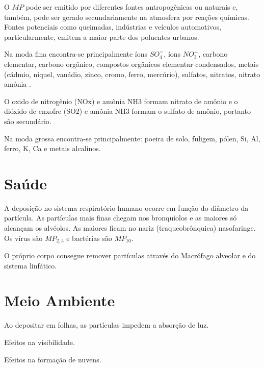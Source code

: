 O $MP$ pode ser emitido por diferentes fontes antropogênicas ou naturais e, 
também, pode ser gerado secundariamente na atmosfera por reações químicas. 
Fontes potenciais como queimadas, indústrias e veículos automotivos, particularmente,
emitem a maior parte dos poluentes urbanos.

Na moda fina encontra-se principalmente íons $SO_4^=$, 
íons $ NO_3^-$, carbono elementar, carbono orgânico, compostos orgânicos elementar
condensados, metais (cádmio, níquel, vanádio, zinco, cromo, ferro, mercúrio), 
sulfatos, nitratos, nitrato amônia \cite{finlayson1999}. 

O oxido de nitrogênio (NOx) e amônia NH3 formam nitrato de amônio e 
o dióxido de enxofre (SO2) e amônia NH3 formam o sulfato de amônio, 
portanto são secundário.

Na moda grossa encontra-se principalmente: poeira de solo, fuligem, 
pólen, Si, Al, ferro, K, Ca e metais alcalinos.

\section{Saúde}

A deposição no sistema respiratório humano ocorre em função do diâmetro da partícula.
As partículas mais finas chegam nos bronquíolos e as maiores só alcançam os alvéolos.
As maiores ficam no nariz (traqueobrônquica) nasofaringe. 
Os vírus são $MP_{2,5}$ e bactérias são $MP_{10}$. 

O próprio corpo consegue remover partículas através do Macrófago alveolar 
e do sistema linfático. 

\section{Meio Ambiente}
Ao depositar em folhas, as partículas impedem a absorção de luz. 

Efeitos na visibilidade.

Efeitos na formação de nuvens.


